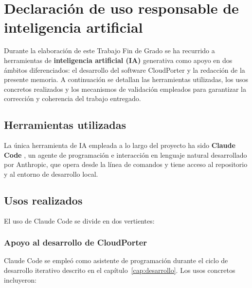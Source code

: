 \chapter*{Declaración de uso responsable de inteligencia artificial}

Durante la elaboración de este Trabajo Fin de Grado se ha recurrido a herramientas de
\textbf{inteligencia artificial (IA)} generativa como apoyo en dos ámbitos diferenciados:
el desarrollo del software CloudPorter y la redacción de la presente memoria. A continuación
se detallan las herramientas utilizadas, los usos concretos realizados y los mecanismos de
validación empleados para garantizar la corrección y coherencia del trabajo entregado.

\section*{Herramientas utilizadas}

La única herramienta de IA empleada a lo largo del proyecto ha sido \textbf{Claude Code}
\cite{claudeCode}, un agente de programación e interacción en lenguaje natural desarrollado
por Anthropic, que opera desde la línea de comandos y tiene acceso al repositorio y al
entorno de desarrollo local.

\section*{Usos realizados}

El uso de Claude Code se divide en dos vertientes:

\subsection*{Apoyo al desarrollo de CloudPorter}

Claude Code se empleó como asistente de programación durante el ciclo de desarrollo iterativo
descrito en el capítulo~\ref{cap:desarrollo}. Los usos concretos incluyeron:

